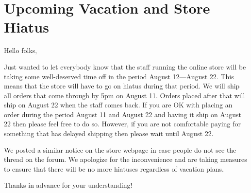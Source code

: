 \chapter{Upcoming Vacation and Store Hiatus}

\begin{refsection}

Hello folks,

Just wanted to let everybody know that the staff running the online store will be taking some well-deserved time off in the period August 12---August 22. This means that the store will have to go on hiatus during that period. We will ship all orders that come through by 5pm on August 11. Orders placed after that will ship on August 22 when the staff comes back. If you are OK with placing an order during the period August 11 and August 22 and having it ship on August 22 then please feel free to do so. However, if you are not comfortable paying for something that has delayed shipping then please wait until August 22.

We posted a similar notice on the store webpage in case people do not see the thread on the forum. We apologize for the inconvenience and are taking measures to ensure that there will be no more hiatuses regardless of vacation plans. 

Thanks in advance for your understanding!

\printbibliography[heading=subbibliography]

\end{refsection}